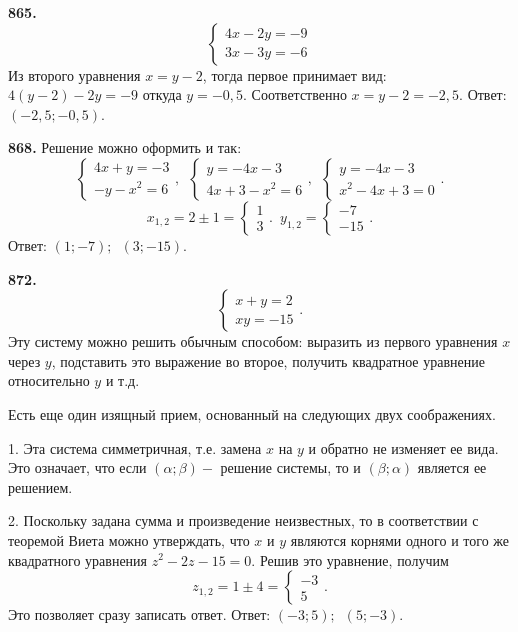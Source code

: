 \textbf{865.}  $$\begin{cases} 4x-2y=-9 \\ 3x-3y=-6 \end{cases}$$ Из второго уравнения $x=y-2$, тогда первое принимает вид: $4(y-2)-2y=-9$ откуда $y=-0,5$. Соответственно $x=y-2=-2,5.$ \newline \null \hspace*{\fill} Ответ: $(-2,5;-0,5)$.             

\newpage \textbf{868.} Решение можно оформить и так:
$$\begin{cases} 4x+y=-3 \\ -y-x^2=6 \end{cases},\enspace\begin{cases} y=-4x-3 \\ 4x+3-x^2=6 \end{cases},\enspace \begin{cases} y=-4x-3 \\ x^2-4x+3=0 \end{cases}.$$ $$x_{1,2}=2\pm1=\begin{cases}1 \\ 3 \end{cases}.\enspace y_{1,2}=\begin{cases}-7 \\ -15 \end{cases}.$$ \newline \null \hspace*{\fill} Ответ: $(1;-7);\enspace(3;-15)$.

\textbf{872.}  $$\begin{cases}x+y=2\\ xy=-15 \end{cases}.$$ Эту систему можно решить обычным способом: выразить  из первого уравнения $x$ через $y$, подставить это выражение во второе, получить квадратное уравнение относительно $y$ и т.д. 

Есть еще один изящный прием, основанный на следующих двух соображениях.  

1. Эта система симметричная, т.е. замена $x$ на $y$ и обратно не изменяет ее вида. Это означает, что если $(\alpha;\beta)-$ решение системы, то и $(\beta;\alpha)$ является ее решением. 

2. Поскольку задана сумма и произведение неизвестных, то в соответствии с теоремой Виета можно утверждать, что $x$ и $y$ являются корнями одного и того же квадратного уравнения  $z^2-2z-15=0$. Решив это уравнение, получим  $$z_{1,2}=1\pm4=\begin{cases}-3\\ 5 \end{cases}.$$ Это позволяет сразу записать ответ. \newline \null \hspace*{\fill} Ответ: $(-3;5);\enspace(5;-3)$.  

